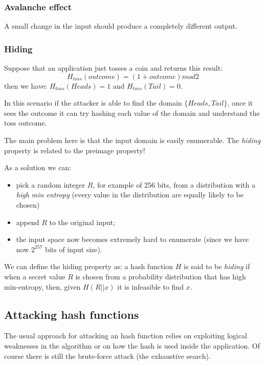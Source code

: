 \subsubsection{Avalanche effect}
A small change in the input should produce a completely different output.

\subsubsection{Hiding}
Suppose that an application just tosses a coin and returns this result:
$$
    H_{toss}(outcome) = (1+outcome) mod 2
$$
then we have: $H_{toss}(Heads) = 1$ and $H_{toss}(Tail) = 0$.

In this scenario if the attacker is able to find the domain $\{Heads, Tail\}$, once it sees the outcome it can try hashing each value of the domain and understand the toss outcome.

The main problem here is that the input domain is easily enumerable.
The \emph{hiding} property is related to the preimage property!

As a solution we can:
\begin{itemize}
    \item pick a random integer $R$, for example of 256 bits, from a distribution with a \emph{high min entropy} (every value in the distribution are equally likely to be chosen)

    \item append $R$ to the original input;

    \item the input space now becomes extremely hard to enumerate (since we have now $2^{257}$ bits of input size).
\end{itemize}

We can define the hiding property as: a hash function $H$ is said to be \emph{hiding} if when a secret value $R$ is chosen from a probability distribution that has high min-entropy, then, given $H(R || x)$ it is infeasible to find $x$.

\subsection{Attacking hash functions}
The usual approach for attacking an hash function relies on exploiting logical weaknesses in the algorithm or on how the hash is used inside the application.
Of course there is still the brute-force attack (the exhaustive search).


